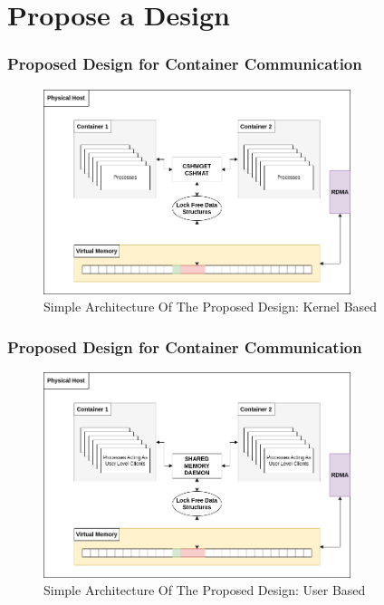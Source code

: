 \documentclass{beamer}
\begin{document}
\section{Propose a Design}

\begin{frame}
    \frametitle{Proposed Design for Container Communication}
    \begin{figure}
        \centering
        \includegraphics[width=0.8\textwidth]{dist.png}
        \caption{Simple Architecture Of The Proposed Design: Kernel Based}
        \label{fig:desg}
    \end{figure}
\end{frame}

\begin{frame}
    \frametitle{Proposed Design for Container Communication}
    \begin{figure}
        \centering
        \includegraphics[width=0.8\textwidth]{res3.png}
        \caption{Simple Architecture Of The Proposed Design: User Based}
        \label{fig:desg2}
    \end{figure}
\end{frame}
\end{document}
